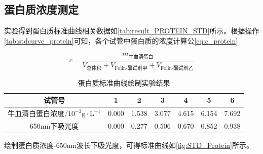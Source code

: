 \newpage
\subsection{蛋白质浓度测定}
实验得到蛋白质标准曲线相关数据如\autoref{tab:result_PROTEIN_STD}所示。根据操作\autoref{tab:stdcurve_protein}可知，各个试管中蛋白质的浓度计算公\autoref{eq:c_protein}

\begin{equation}
    c = \frac{m_\text{牛血清蛋白}}{V_\text{总体积}+V_\text{Folin-酚试剂甲}+V_\text{Folin-酚试剂乙}}
    \label{eq:c_protein}
\end{equation}

\begin{table}[H]
\centering
\caption{蛋白质标准曲线绘制实验结果}
\label{tab:result_PROTEIN_STD}
\begin{tabular}{@{}ccccccc@{}}
\toprule
试管号       & 1     & 2     & 3     & 4     & 5     & 6     \\ \midrule
牛血清白蛋白浓度/$10^{-2}\mathrm{g \cdot L^{-1}}$ & 0.000 & 1.538 & 3.077 & 4.615 & 6.154 & 7.692 \\
650nm下吸光度 & 0.000 & 0.277 & 0.506 & 0.670 & 0.852 & 0.938 \\ \bottomrule
\end{tabular}
\end{table}

绘制蛋白质浓度-650nm波长下吸光度，可得标准曲线如\autoref{fig:STD_Protein}所示。

